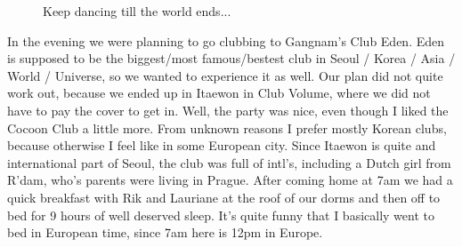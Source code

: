 \begin{post}
\begin{content}
\begin{figure}
\centering{}
\caption{Keep dancing till the world ends...}
\vspace{-12pt}
\end{figure}In the evening we were planning to go clubbing to Gangnam's Club Eden. Eden is supposed to be the biggest/most famous/bestest club in Seoul / Korea / Asia / World / Universe, so we wanted to experience it as well. Our plan did not quite work out, because we ended up in Itaewon in Club Volume, where we did not have to pay the cover to get in. Well, the party was nice, even though I liked the Cocoon Club a little more. From unknown reasons I prefer mostly Korean clubs, because otherwise I feel like in some European city. Since Itaewon is quite and international part of Seoul, the club was full of intl's, including a Dutch girl from R'dam, who's parents were living in Prague. After coming home at 7am we had a quick breakfast with Rik and Lauriane at the roof of our dorms and then off to bed for 9 hours of well deserved sleep. It's quite funny that I basically went to bed in European time, since 7am here is 12pm in Europe.

\end{content}
\end{post}
